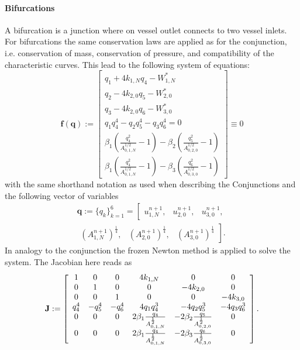 \documentclass[a4paper, oneside]{discothesis}
\begin{document}
					\paragraph{Bifurcations} \label{par:bifurcations}
					A bifurcation is a junction where on vessel outlet connects to two vessel inlets.
					For bifurcations the same conservation laws are applied as for the conjunction, i.e. conservation of mass, conservation of pressure, and compatibility of the characteristic curves.
					This lead to the following system of equations:
					\begin{equation}
						\mathbf{f}(\mathbf{q}):=\left[\begin{array}{c}
								q_{1}+4 k_{1,N} q_{4}-W_{1,N}^* \\
								q_{2}-4 k_{2,0} q_{5}-W_{2,0}^* \\
								q_{3}-4 k_{2,0} q_{6}-W_{3,0}^* \\
								q_{1} q_{4}^4-q_{2} q_{5}^4-q_{3} q_{6}^4=0 \\
								\beta_1\left(\frac{q_{4}^2}{A_{0,1,N}^{1 / 2}}-1\right)-\beta_2\left(\frac{q_{5}^2}{A_{0,2,0}^{1 / 2}}-1\right) \\
								\beta_1\left(\frac{q_{4}^2}{A_{0,1,N}^{1 / 2}}-1\right)-\beta_3\left(\frac{q_{6}^2}{A_{0,3,0}^{1 / 2}}-1\right) 
						\end{array}\right] \equiv 0 \label{syseq_bif}
					\end{equation}
					with the same shorthand notation as used when describing the Conjunctions and the following vector of variables
					\begin{multline}
						\mathbf{q}:=\{q_k\}_{k=1}^6 = \left[
							\begin{array}{lll}
								u_{1,N}^{n+1}, & u_{2,0}^{n+1}, & u_{3,0}^{n+1},
						\end{array} \right. \\
						\left. \begin{array} {lll}    \left(A_{1,N}^{n+1}\right)^{\frac{1}{4}}, & \left(A_{2,0}^{n+1}\right)^{\frac{1}{4}}, & \left(A_{3,0}^{n+1}\right)^{\frac{1}{4}}
						\end{array}\right].
							\end{multline}
							In analogy to the conjunction the frozen Newton method is applied to solve the system.
							The Jacobian here reads as
							\begin{equation}
								\mathbf{J}:=\left[\begin{array}{c c c c c c}
										1&0&0&4k_{1,N}&0&0\\
										0&1&0&0&-4k_{2,0}&0\\
										0&0&1&0&0&-4k_{3,0}\\
										q_{4}^4 & -q_{5}^4 & -q_{6}^4 & 4q_{1}q_{4}^3 & -4q_{2}q_{5}^3 & -4q_{3}q_{6}^3 \\
										0 & 0 & 0 & 2\beta_1\frac{q_{4}}{A_{0,1,N}^{\frac{1}{2}}} & -2\beta_2\frac{q_{5}}{A_{0,2,0}^{\frac{1}{2}}} & 0\\
										0 & 0 & 0 & 2\beta_1\frac{q_{4}}{A_{0,1,N}^{\frac{1}{2}}} & -2\beta_3\frac{q_{6}}{A_{0,3,0}^{\frac{1}{2}}} & 0\\
									\end{array} 
								\right].
							\end{equation}
\end{document}

